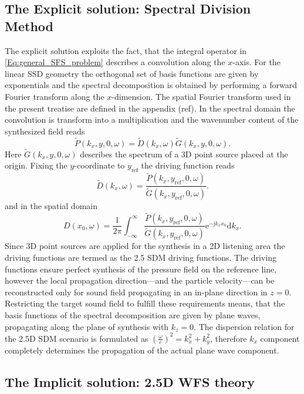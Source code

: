 \documentclass[journal]{IEEEtran}
\newcommand{\td}{\mathrm{d}}
\newcommand{\te}{\mathrm{e}}
\newcommand{\ti}{\mathrm{j}}
\newcommand{\yref}{y_{\mathrm{ref}}}
\begin{document}
\subsection{The Explicit solution: Spectral Division Method}

The explicit solution exploits the fact, that the integral operator in \eqref{Eq:general_SFS_problem} describes a convolution along the $x$-axis. 
For the linear SSD geometry the orthogonal set of basis functions are given by exponentials and the spectral decomposition is obtained by performing a forward Fourier transform along the $x$-dimension.
The spatial Fourier transform used in the present treatise are defined in the appendix (ref). 
In the spectral domain the convolution is transform into a multiplication and the wavenumber content of the synthesized field reads
\begin{equation}
\tilde{P}(k_x, y, 0, \omega) = \tilde{D}(k_x, \omega) \tilde{G}(k_x, y, 0,\omega).
\end{equation}
Here $\tilde{G}(k_x,y,0,\omega)$ describes the spectrum of a 3D point source placed at the origin.
Fixing the $y$-coordinate to $\yref$ the driving function reads
\begin{equation}
\tilde{D}(k_x,\omega) = \frac{\tilde{P}(k_x, \yref, 0, \omega)}{\tilde{G}(k_x, \yref, 0,\omega)}.
\end{equation}
and in the spatial domain
\begin{equation}
D(x_0,\omega) = \frac{1}{2\pi} \int_{-\infty}^{\infty} \frac{\tilde{P}(k_x, \yref, 0, \omega)}{\tilde{G}(k_x, \yref, 0,\omega)} \te^{- \ti k_x x_0} \td k_x.
\end{equation}
Since 3D point sources are applied for the synthesis in a 2D listening area the driving functions are termed as the 2.5 SDM driving functions.
The driving functions ensure perfect synthesis of the pressure field on the reference line, however the local propagation direction---and the particle velocity---can be reconstructed only for sound field propagating in an in-plane direction in $z=0$.
Restricting the target sound field to fulfill these requirements means, that the basis functions of the spectral decomposition are given by plane waves, propagating along the plane of synthesis with $k_z = 0$. 
The dispersion relation for the 2.5D SDM scenario is formulated as $\left( \frac{\omega}{c} \right)^2 = k_x^2 + k_y^2$, therefore $k_x$ component completely determines the propagation of the actual plane wave component.

\subsection{The Implicit solution: 2.5D WFS theory}
\end{document}
